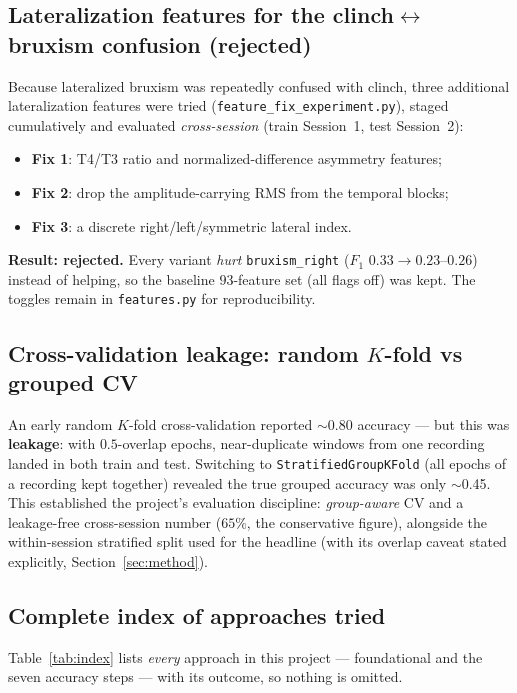 \documentclass[11pt,a4paper]{article}
\newcommand{\fone}{$F_1$}
\newcommand{\code}[1]{\texttt{#1}}
\begin{document}
\subsection{Lateralization features for the clinch$\leftrightarrow$bruxism
confusion (rejected)}
Because lateralized bruxism was repeatedly confused with clinch, three additional
lateralization features were tried (\code{feature\_fix\_experiment.py}), staged
cumulatively and evaluated \emph{cross-session} (train Session~1, test
Session~2):
\begin{itemize}[noitemsep]
  \item \textbf{Fix 1}: T4/T3 ratio and normalized-difference asymmetry features;
  \item \textbf{Fix 2}: drop the amplitude-carrying RMS from the temporal blocks;
  \item \textbf{Fix 3}: a discrete right/left/symmetric lateral index.
\end{itemize}
\textbf{Result: rejected.} Every variant \emph{hurt} \code{bruxism\_right}
(\fone{} $0.33 \rightarrow 0.23$--$0.26$) instead of helping, so the baseline
$93$-feature set (all flags off) was kept. The toggles remain in
\code{features.py} for reproducibility.

\subsection{Cross-validation leakage: random $K$-fold vs grouped CV}
An early random $K$-fold cross-validation reported $\sim$0.80 accuracy --- but
this was \textbf{leakage}: with $0.5$-overlap epochs, near-duplicate windows from
one recording landed in both train and test. Switching to
\code{StratifiedGroupKFold} (all epochs of a recording kept together) revealed the
true grouped accuracy was only $\sim$0.45. This established the project's
evaluation discipline: \emph{group-aware} CV and a leakage-free cross-session
number ($65\%$, the conservative figure), alongside the within-session stratified
split used for the headline (with its overlap caveat stated explicitly,
Section~\ref{sec:method}).

\subsection{Complete index of approaches tried}
Table~\ref{tab:index} lists \emph{every} approach in this project --- foundational
and the seven accuracy steps --- with its outcome, so nothing is omitted.
\end{document}
